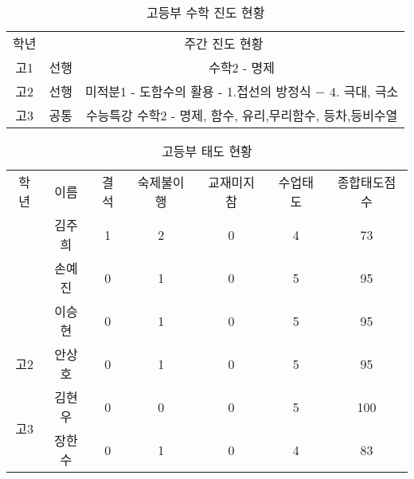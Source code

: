 \documentclass[idxtotoc,hyperref,openany]{labbook} %
\begin{document}


\begin{table}[h]
\centering
\begin{adjustbox}{width=\textwidth}
\begin{tabular}{c||c|c}
\toprule
\midrule
학년 & \multicolumn{2}{c}{주간 진도 현황} \\
\hhline{=||==}
고1 & 선행 & 수학2 - 명제\\
\hline
고2 & 선행 & 미적분1 - 도함수의 활용 - 1.접선의 방정식 $-$ 4. 극대, 극소\\
\hline
\multirow{1}{*}{고3} & 공통 & 수능특강 수학2 - 명제, 함수, 유리,무리함수, 등차,등비수열 \\

\hline
\end{tabular}
\end{adjustbox}
\caption{\label{tab:ii} 고등부 수학 진도 현황 }
\end{table}





\begin{table}[H]
\centering
\begin{adjustbox}{width=\textwidth}
\begin{tabular}{c|c||c|c|c|c|c}
\toprule
\midrule
학년 & 이름 & 결석 & 숙제불이행 & 교재미지참 & 수업태도 & 종합태도점수 \\
\hhline{=|=||=|=|=|=|=}
\multirow{3}{*}{고1}			& 김주희 & 1 & 2 & 0 & 4 & 73   \\ \hhline{~------}
					& 손예진 & 0 & 1 & 0 & 5 & 95  \\ \hhline{~------}
					& 이승현 & 0 & 1 & 0 & 5 & 95  \\
\hline
\multirow{1}{*}{고2}			& 안상호 & 0 & 1 & 0 & 5 & 95	\\ 
\hline
\multirow{2}{*}{고3}			& 김현우 & 0 & 0 & 0 & 5 & 100  \\ \hhline{~------}
					& 장한수 & 0 & 1 & 0 & 4 & 83	\\
\hline
\end{tabular}
\end{adjustbox}
\caption{\label{tab:iii} 고등부 태도 현황 }
\end{table}

\end{document}
